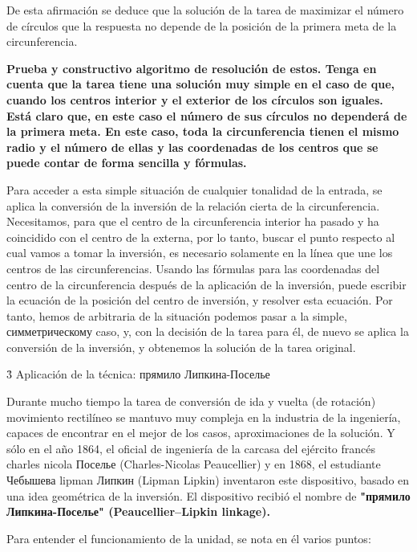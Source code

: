 De esta afirmación se deduce que la solución de la tarea de maximizar el número de círculos que la respuesta no depende de la posición de la primera meta de la circunferencia.

\bf{Prueba} y constructivo algoritmo de resolución de estos. Tenga en cuenta que la tarea tiene una solución muy simple en el caso de que, cuando los centros interior y el exterior de los círculos son iguales. Está claro que, en este caso el número de sus círculos no dependerá de la primera meta. En este caso, toda la circunferencia tienen el mismo radio y el número de ellas y las coordenadas de los centros que se puede contar de forma sencilla y fórmulas.

Para acceder a esta simple situación de cualquier tonalidad de la entrada, se aplica la conversión de la inversión de la relación cierta de la circunferencia. Necesitamos, para que el centro de la circunferencia interior ha pasado y ha coincidido con el centro de la externa, por lo tanto, buscar el punto respecto al cual vamos a tomar la inversión, es necesario solamente en la línea que une los centros de las circunferencias. Usando las fórmulas para las coordenadas del centro de la circunferencia después de la aplicación de la inversión, puede escribir la ecuación de la posición del centro de inversión, y resolver esta ecuación. Por tanto, hemos de arbitraria de la situación podemos pasar a la simple, симметрическому caso, y, con la decisión de la tarea para él, de nuevo se aplica la conversión de la inversión, y obtenemos la solución de la tarea original.


\h3{ Aplicación de la técnica: прямило Липкина-Поселье }

Durante mucho tiempo la tarea de conversión de ida y vuelta (de rotación) movimiento rectilíneo se mantuvo muy compleja en la industria de la ingeniería, capaces de encontrar en el mejor de los casos, aproximaciones de la solución. Y sólo en el año 1864, el oficial de ingeniería de la carcasa del ejército francés charles nicola Поселье (Charles-Nicolas Peaucellier) y en 1868, el estudiante Чебышева lipman Липкин (Lipman Lipkin) inventaron este dispositivo, basado en una idea geométrica de la inversión. El dispositivo recibió el nombre de \bf{"прямило Липкина-Поселье"} (Peaucellier–Lipkin linkage).


Para entender el funcionamiento de la unidad, se nota en él varios puntos:



